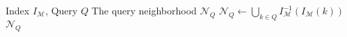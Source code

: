 \begin{algorithm}[!b]
	\begin{algorithmic}[1]
		\Require Index $I_{\mathcal{M}}$, Query $Q$
		\Ensure The query neighborhood $\mathcal{N}_Q$
		\State $\mathcal{N}_Q \leftarrow \bigcup_{k \in Q}I_{\mathcal{M}}^{-1}(I_{\mathcal{M}}(k))$\;
		\State \Return $\mathcal{N}_Q$
	\end{algorithmic}
	\caption{$\texttt{search}(I_{\mathcal{M}}, Q)$}\label{alg:search}
\end{algorithm}
